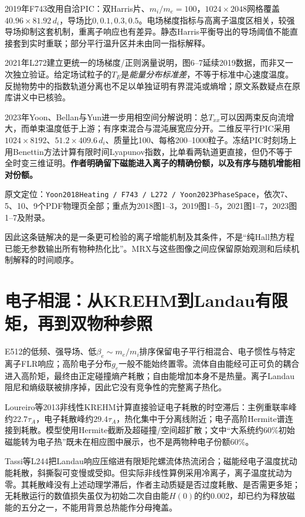 \documentclass[UTF8,a4paper,11pt,openany,fontset=fandol]{ctexbook}
\newcommand{\loc}[2]{\par\noindent\textsf{原文定位：}\texttt{#1}，#2。\par}
\begin{document}
2019年F743改用自洽PIC：双Harris片、$m_i/m_e=100$，$1024\times2048$网格覆盖$40.96\times81.92\,d_i$，导场比$0,0.1,0.3,0.5$。电场梯度指标与高离子温度区相关，较强导场抑制这套机制，重离子响应也有差异。静态Harris平衡导出的导场阈值不能直接套到实时重联；部分平行温升区并未由同一指标解释。\citep{F743}

2021年L272建立更统一的场梯度/正则涡量说明，图6--7延续2019数据，而非又一次独立验证。给定场试粒子的$T_E$是\emph{能量分布标准差}，不等于标准中心速度温度。反抛物势中的指数轨道分离也不足以单独证明有界混沌或熵增；原文系数疑点在原库讲义中已核验。\citep{L272}

2023年Yoon、Bellan与Yun进一步用相空间分解说明：总$T_{xx}$可以因两束反向流增大，而单束温度低于上游；有序束混合与混沌展宽应分开。二维反平行PIC采用$1024\times8192$、$51.2\times409.6\,d_i$、质量比100、每格200--1000粒子。冻结PIC时刻场上用Benettin方法计算有限时间Lyapunov指数，比单看两轨道更直接，但仍不等于全时变三维证明。\textbf{作者明确留下磁能进入离子的精确份额，以及有序与随机增能相对份额。}\citep{Yoon2023PhaseSpace}
\loc{Yoon2018Heating / F743 / L272 / Yoon2023PhaseSpace}{依次7、5、10、9个PDF物理页全部；重点为2018图1--3，2019图1--5，2021图1--7，2023图1--7及附录}

因此这条链解决的是一条更可检验的离子增能机制及其条件，不是“纯Hall热方程已能无参数输出所有物种热化比”。MRX与这些图像之间应保留原始观测和后续机制解释的时间顺序。

\section{电子相混：从KREHM到Landau有限矩，再到双物种参照}
E512的低频、强导场、低$\beta_e\sim m_e/m_i$排序保留电子平行相混合、电子惯性与特定离子FLR响应；高阶电子分布$g_e$一般不能始终置零。流体自由能经可正可负的耦合进入高阶矩，最终由正定碰撞熵产耗散；自由能增加本身不是热量。离子Landau阻尼和熵级联被排序掉，因此它没有竞争性的完整离子热化。\citep{E512}

Loureiro等2013非线性KREHM计算直接验证电子耗散的时空滞后：主例重联率峰约$22.7\tau_A$，电子耗散峰约$29.4\tau_A$，热化集中于分离线附近；电子高阶Hermite谱连接到耗散。模型使用Hermite截断及超碰撞/空间超扩散；文中“大系统约60\%初始磁能转为电子热”既未在相应图中展示，也不是两物种电子份额60\%。\citep{Loureiro2013Heating}

Tassi等L244把Landau响应压缩进有限矩陀螺流体热流闭合；磁能经电子温度扰动能耗散，斜撕裂可变慢或受抑。但实际非线性算例采用冷离子，离子温度扰动为零。其耗散峰没有上述动理学滞后，作者主动质疑是否过度耗散、是否需更多矩；无耗散运行的数值损失虽仅为初始二次自由能$H(0)$的约0.002，却已约为释放磁能的五分之一，不能用背景总热能作分母掩盖。\citep{L244}
\end{document}
